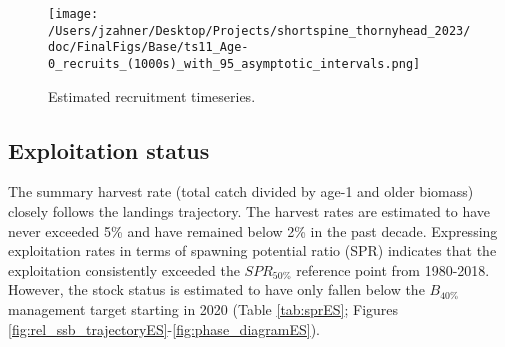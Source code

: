 \documentclass[11pt,
  english,
  letterpaper,
]{article}
\begin{document}
\begin{figure}
\centering
\texttt{[image: /Users/jzahner/Desktop/Projects/shortspine\_thornyhead\_2023/doc/FinalFigs/Base/ts11\_Age-0\_recruits\_(1000s)\_with\_95\_asymptotic\_intervals.png]}
\caption{Estimated recruitment timeseries.\label{fig:rec_trajectoryES}}
\end{figure}

\hypertarget{exploitation-status}{%
\subsection*{Exploitation status}\label{exploitation-status}}

The summary harvest rate (total catch divided by age-1 and older biomass) closely follows the landings trajectory. The harvest rates are estimated to have never exceeded 5\% and have remained below 2\% in the past decade. Expressing exploitation rates in terms of spawning potential ratio (SPR) indicates that the exploitation consistently exceeded the \(SPR_{50\%}\) reference point from 1980-2018. However, the stock status is estimated to have only fallen below the \(B_{40\%}\) management target starting in 2020 (Table \ref{tab:sprES}; Figures \ref{fig:rel_ssb_trajectoryES}-\ref{fig:phase_diagramES}).

\begingroup\fontsize{10}{12}\selectfont
\begingroup\fontsize{10}{12}\selectfont
\end{document}
